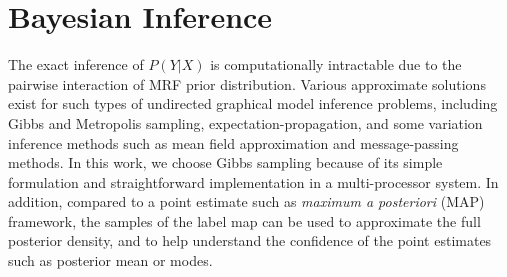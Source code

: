\documentclass[review,authoryear]{elsarticle}
\begin{document}
\section{Bayesian Inference}
\label{sec:inference}
The exact inference of $P(Y|X)$ is computationally intractable due to the
pairwise interaction of MRF prior distribution. Various approximate solutions
exist for such types of undirected graphical model inference problems, including
Gibbs and Metropolis sampling, expectation-propagation, and some variation
inference methods such as mean field approximation and message-passing
methods. In this work, we choose Gibbs sampling because of its simple
formulation and straightforward implementation in a multi-processor system. In
addition, compared to a point estimate such as \emph{maximum a posteriori} (MAP)
framework, the samples of the label map can be used to approximate the full
posterior density, and to help understand the confidence of the point estimates
such as posterior mean or modes.
\end{document}
